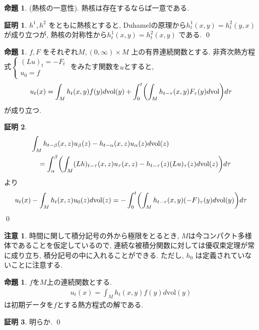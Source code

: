 \documentclass[twocolumn, landscape, a4paper , 8pt, fleqn, titlepage ]{jsarticle}
\theoremstyle{definition}
\newtheorem{prop}[dfn]{命題}
\newtheorem*{pf*}{証明}
\newtheorem{remark}[dfn]{注意}
\newcommand{\paren}[1]{\mleft( #1\mright )}
\newcommand{\vol}{\textrm{vol}}
\renewcommand{\-}{\hyphen}
\begin{document}
\begin{prop}(熱核の一意性).
熱核は存在するならば一意である. 
\end{prop}
\begin{pf*}
 $h^1, h^2$ をともに熱核とすると, Duhamelの原理から$h^1_t(x,y) = h^2_t (y,x)$ が成り立つが, 熱核の対称性から$h^1_t(x,y) = h^2_t (x,y)$ である. 
\qed
\end{pf*}


\begin{prop}
$f,F$ をそれぞれ$M, (0,\infty)\times M$ 上の有界連続関数とする. 非斉次熱方程式$\begin{cases} (Lu)_t = - F_t \\ u_0 = f \end{cases}$ をみたす関数を$u$とすると, 
\begin{align*} u_t (x) = \int_M h_t (x,y) f(y) d \vol(y) + \int_0^t \paren{\int_M h_{t - \tau}(x,y)F_\tau (y) d \vol } d \tau \end{align*}
が成り立つ. 
\end{prop}
\begin{pf*}
\begin{align*} &\int_M h_{t - \beta} (x,z) u_\beta (z) - h_{t -\alpha} (x,z) u_\alpha (z) d\vol(z) \\ &\quad = \int_\alpha^\beta \paren {\int_M (Lh)_{t - \tau} (x,z) u_\tau (x, z) - h_{t-\tau}(z)(Lu)_\tau (z) d \vol(z) } d \tau \end{align*}
より
\begin{align*} u_t (x) -  \int_M h_t(x,z)u_0 (z) d \vol(z) =  - \int_0^t \paren{\int_M h_{t-\tau}(x,y) (-F)_\tau (y) d \vol(y) } d \tau  \end{align*}
\qed
\end{pf*}

\begin{remark}
時間に関して積分記号の外から極限をとるとき, $M$は今コンパクト多様体であることを仮定しているので, 連続な被積分関数に対しては優収束定理が常に成り立ち, 積分記号の中に入れることができる. ただし, $h_0$ は定義されていないことに注意する.
\end{remark}

\begin{prop}$f$を$M$上の連続関数とする. 
\begin{align*} u_t (x) = \int_M h_t (x,y) f(y) d \vol(y) \end{align*}
は初期データを$f$とする熱方程式の解である.
\end{prop}
\begin{pf*}
明らか.
\qed
\end{pf*}
\end{document}
